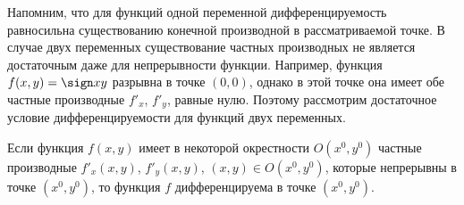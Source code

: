 Напомним, что для функций одной переменной дифференцируемость равносильна существованию конечной производной в рассматриваемой точке. В случае двух переменных существование частных производных не является достаточным даже для непрерывности функции. Например, функция $f(x,y)=\sign xy $ разрывна в точке $(0, 0)$, однако в этой точке она имеет обе частные производные $f'_x$, $f'_y$, равные нулю. Поэтому рассмотрим достаточное условие дифференцируемости для функций двух переменных.
\begin{thm} \label{ch8th1}
Если функция $f(x,y)$ имеет в некоторой окрестности $O(x^0, y^0)$ частные производные $f'_x(x,y)$, $f'_y(x,y)$, $(x,y) \in O(x^0, y^0)$, которые непрерывны в точке $(x^0, y^0)$, то функция $f$ дифференцируема в точке $(x^0, y^0)$.
\end{thm}
